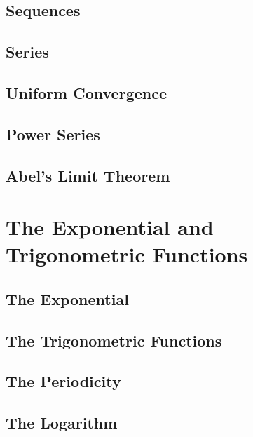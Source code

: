 \subsection{Sequences}

\subsection{Series}

\subsection{Uniform Convergence}

\subsection{Power Series}

\subsection{Abel's Limit Theorem}

\section{The Exponential and Trigonometric Functions}

\subsection{The Exponential}

\subsection{The Trigonometric Functions}

\subsection{The Periodicity}

\subsection{The Logarithm}

